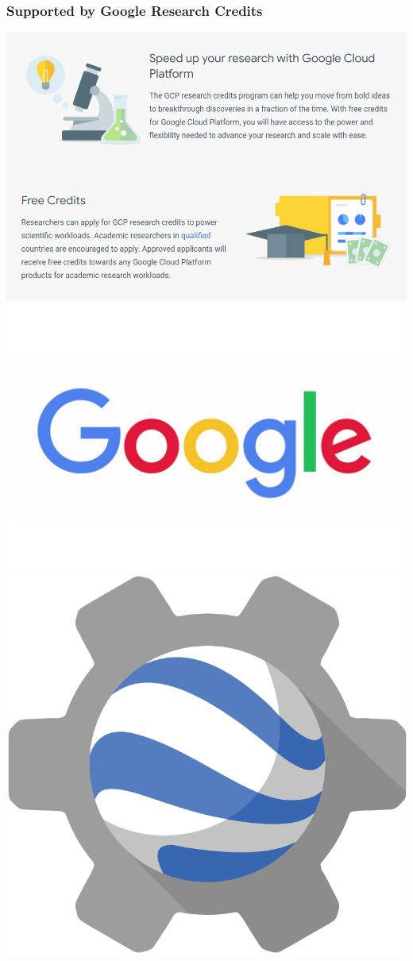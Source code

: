 \begin{frame}
\frametitle{Supported by Google Research Credits}

\includegraphics[width=.3\textwidth]{images/google_research_credits}
\includegraphics[width=.3\textwidth]{images/google}
\includegraphics[width=.2\textwidth]{images/earth-engine-logo}


\end{frame}
